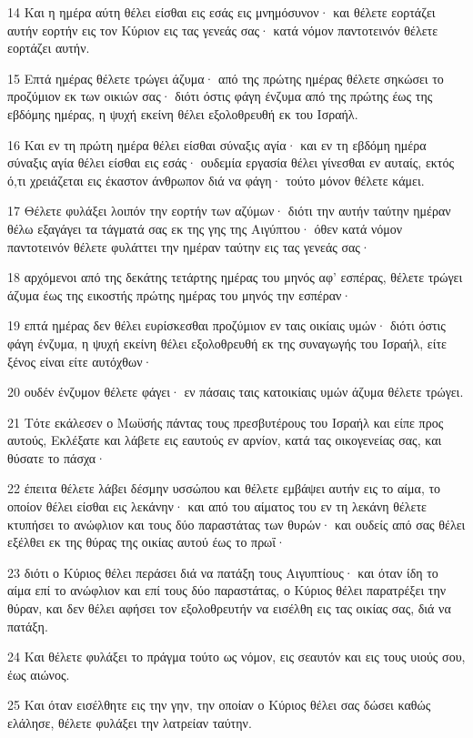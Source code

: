 \par 14 Και η ημέρα αύτη θέλει είσθαι εις εσάς εις μνημόσυνον· και θέλετε εορτάζει αυτήν εορτήν εις τον Κύριον εις τας γενεάς σας· κατά νόμον παντοτεινόν θέλετε εορτάζει αυτήν.
\par 15 Επτά ημέρας θέλετε τρώγει άζυμα· από της πρώτης ημέρας θέλετε σηκώσει το προζύμιον εκ των οικιών σας· διότι όστις φάγη ένζυμα από της πρώτης έως της εβδόμης ημέρας, η ψυχή εκείνη θέλει εξολοθρευθή εκ του Ισραήλ.
\par 16 Και εν τη πρώτη ημέρα θέλει είσθαι σύναξις αγία· και εν τη εβδόμη ημέρα σύναξις αγία θέλει είσθαι εις εσάς· ουδεμία εργασία θέλει γίνεσθαι εν αυταίς, εκτός ό,τι χρειάζεται εις έκαστον άνθρωπον διά να φάγη· τούτο μόνον θέλετε κάμει.
\par 17 Θέλετε φυλάξει λοιπόν την εορτήν των αζύμων· διότι την αυτήν ταύτην ημέραν θέλω εξαγάγει τα τάγματά σας εκ της γης της Αιγύπτου· όθεν κατά νόμον παντοτεινόν θέλετε φυλάττει την ημέραν ταύτην εις τας γενεάς σας·
\par 18 αρχόμενοι από της δεκάτης τετάρτης ημέρας του μηνός αφ' εσπέρας, θέλετε τρώγει άζυμα έως της εικοστής πρώτης ημέρας του μηνός την εσπέραν·
\par 19 επτά ημέρας δεν θέλει ευρίσκεσθαι προζύμιον εν ταις οικίαις υμών· διότι όστις φάγη ένζυμα, η ψυχή εκείνη θέλει εξολοθρευθή εκ της συναγωγής του Ισραήλ, είτε ξένος είναι είτε αυτόχθων·
\par 20 ουδέν ένζυμον θέλετε φάγει· εν πάσαις ταις κατοικίαις υμών άζυμα θέλετε τρώγει.
\par 21 Τότε εκάλεσεν ο Μωϋσής πάντας τους πρεσβυτέρους του Ισραήλ και είπε προς αυτούς, Εκλέξατε και λάβετε εις εαυτούς εν αρνίον, κατά τας οικογενείας σας, και θύσατε το πάσχα·
\par 22 έπειτα θέλετε λάβει δέσμην υσσώπου και θέλετε εμβάψει αυτήν εις το αίμα, το οποίον θέλει είσθαι εις λεκάνην· και από του αίματος του εν τη λεκάνη θέλετε κτυπήσει το ανώφλιον και τους δύο παραστάτας των θυρών· και ουδείς από σας θέλει εξέλθει εκ της θύρας της οικίας αυτού έως το πρωΐ·
\par 23 διότι ο Κύριος θέλει περάσει διά να πατάξη τους Αιγυπτίους· και όταν ίδη το αίμα επί το ανώφλιον και επί τους δύο παραστάτας, ο Κύριος θέλει παρατρέξει την θύραν, και δεν θέλει αφήσει τον εξολοθρευτήν να εισέλθη εις τας οικίας σας, διά να πατάξη.
\par 24 Και θέλετε φυλάξει το πράγμα τούτο ως νόμον, εις σεαυτόν και εις τους υιούς σου, έως αιώνος.
\par 25 Και όταν εισέλθητε εις την γην, την οποίαν ο Κύριος θέλει σας δώσει καθώς ελάλησε, θέλετε φυλάξει την λατρείαν ταύτην.
